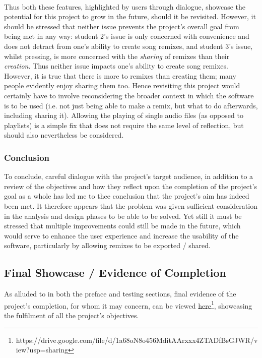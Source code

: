 \paragraph{}
Thus both these features, highlighted by users through dialogue, showcase the potential for this project to grow in the future, should it be revisited. However, it should be stressed that neither issue prevents the project's overall goal from being met in any way: student 2's issue is only concerned with convenience and does not detract from one's ability to create song remixes, and student 3's issue, whilst pressing, is more concerned with the \textit{sharing} of remixes than their \textit{creation}. Thus neither issue impacts one's ability to create song remixes. However, it is true that there is more to remixes than creating them; many people evidently enjoy sharing them too. Hence revisiting this project would certainly have to involve reconsidering the broader context in which the software is to be used (i.e. not just being able to make a remix, but what to do afterwards, including sharing it). Allowing the playing of single audio files (as opposed to playlists) is a simple fix that does not require the same level of reflection, but should also nevertheless be considered.

\subsubsection*{Conclusion}
To conclude, careful dialogue with the project's target audience, in addition to a review of the objectives and how they reflect upon the completion of the project's goal as a whole has led me to thee conclusion that the project's aim has indeed been met. It therefore appears that the problem was given sufficient consideration in the analysis and design phases to be able to be solved. Yet still it must be stressed that multiple improvements could still be made in the future, which would serve to enhance the user experience and increase the usability of the software, particularly by allowing remixes to be exported / shared.

\pagebreak
\subsection{Final Showcase / Evidence of Completion}
As alluded to in both the preface and testing sections, final evidence of the project's completion, for whom it may concern, can be viewed
\href{https://drive.google.com/file/d/1a68oN8o456MditAArxxx4ZTADfBsGJWR/view?usp=sharing}{here}\footnote{
	https://drive.google.com/file/d/1a68oN8o456MditAArxxx4ZTADfBsGJWR/view?usp=sharing
}, showcasing the fulfilment  of all the project's objectives. 